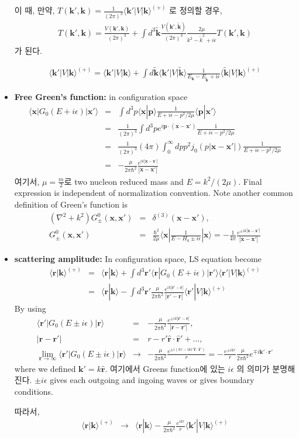 \documentclass[10pt]{book}
\def\bm{\boldsymbol}
\newcommand{\bea}{\begin{eqnarray}}
\newcommand{\eea}{\end{eqnarray}}
\newcommand{\no}{\nonumber \\}
\def\vp{{\bm p}}
\def\vk{{\bm k}}
\def\vx{{\bm x}}
\def\vr{{\bm r}}
\def\la{\langle}
\def\ra{\rangle}
\begin{document}
\begin{itemize}
{이 때,
만약, $T(\vk',\vk)=\frac{1}{(2\pi)^3}\la \vk'|V|\vk\ra^{(+)}$ 로 정의할 경우,
\bea
T(\vk',\vk)=\frac{V(\vk',\vk)}{(2\pi)^3}
           +\int d^3{\tilde\vk}
           \frac{V(\vk',{\tilde\vk})}{(2\pi)^3}
           \frac{2\mu}{k^2-\tilde{k}^2+i\epsilon}
           T(\vk',\vk)
\eea
가 된다. 

}
\bea
\boxed{
\la\vk'|V|\vk\ra^{(+)}
=\la \vk'|V|\vk\ra
+\int d\tilde{\vk}
\la \vk'|V|\tilde{\vk}\ra
\frac{1}{E_\vk-E_{\tilde{\vk}}+i\epsilon}
\la\tilde{\vk}|V|\vk\ra^{(+)} 
}
\eea

\item {\bf Free Green's function:} in configuration space
\bea
\la \vx|G_0(E+i\epsilon)|\vx'\ra
&=&\int d^3 p \la \vx|\vp\ra\frac{1}{E+i\epsilon-p^2/2\mu}\la \vp|\vx'\ra\no 
&=&\frac{1}{(2\pi)^3}\int d^3 p e^{i\vp\cdot(\vx-\vx')}
\frac{1}{E+i\epsilon-p^2/{2\mu}}\no
&=&\frac{1}{(2\pi)^3}(4\pi)\int_0^\infty d p p^2 j_0(p|\vx-\vx'|)
     \frac{1}{E+i\epsilon-p^2/2\mu}\no
&=&-\frac{\mu}{2\pi\hbar^2}
     \frac{e^{i k|\vx-\vx'|}}{|\vx-\vx'|}
\eea
여기서, $\mu=\frac{m}{2}$로 two nucleon reduced mass
and $E=k^2/(2\mu)$. Final expression is independent of normalization
convention. Note another common definition of Green's function is
\bea
(\nabla^2+k^2)G^0_{\pm}(\vx,\vx')&=&\delta^{(3)}(\vx-\vx'),\no
G^0_{\pm}(\vx,\vx')&=&
\frac{\hbar^2}{2\mu}\la \vx|\frac{1}{E-H_0\pm i\epsilon}|\vx\ra 
                  =-\frac{1}{4\pi}\frac{e^{\pm ik|\vx-\vx'|}}{|\vx-\vx'|}
\eea

\item {\bf scattering amplitude:} In configuration space, LS equation become
\bea
\la\vr|\vk\ra^{(+)}
&=&\la \vr|\vk\ra+\int d^3\vr' \la \vr|G_0(E+i\epsilon)|\vr' \ra
 \la\vr'|V|\vk\ra^{(+)} \no 
&=&\la \vr|\vk\ra- \int d^3\vr'\frac{\mu}{2\pi\hbar^2}
   \frac{e^{ik|\vr'-\vr|}}{|\vr'-\vr|}\la \vr'|V|\vk\ra^{(+)}
\eea
By using
\bea
\la \vr'|G_0(E\pm i\epsilon)|\vr \ra&=&-\frac{\mu}{2\pi\hbar^2}
              \frac{e^{\pm i k|\vr'-\vr|}}{|\vr-\vr'|},\no 
|\vr-\vr'|&=& r-r' {\hat \vr}\cdot{\hat \vr'}+\dots,\no 
\lim_{\vr\to \infty}\la \vr'|G_0(E\pm i\epsilon)|\vr \ra
   &\to& -\frac{\mu}{2\pi\hbar^2}
   \frac{e^{\pm i(kr-ikr'\hat{\vr}\cdot{\hat\vr}')}}{r}
   = -\frac{e^{\pm ikr}}{r}\frac{\mu}{2\pi\hbar^2}e^{\mp i\vk' \cdot{\vr}'}
\eea
where we defined $\vk'=k\hat{\vr}$. 여기에서 Greens function에 있는 
$i\epsilon$ 의 의미가 분명해진다. $\pm i\epsilon $ gives each outgoing and
ingoing waves or gives boundary conditions.

따라서, 
\bea
\la\vr|\vk\ra^{(+)}
&\to&\la \vr|\vk\ra- \frac{\mu}{2\pi\hbar^2}\frac{e^{ikr}}{r}\la \vk'|V|\vk\ra^{(+)}
\eea


\end{itemize}
\end{document}
